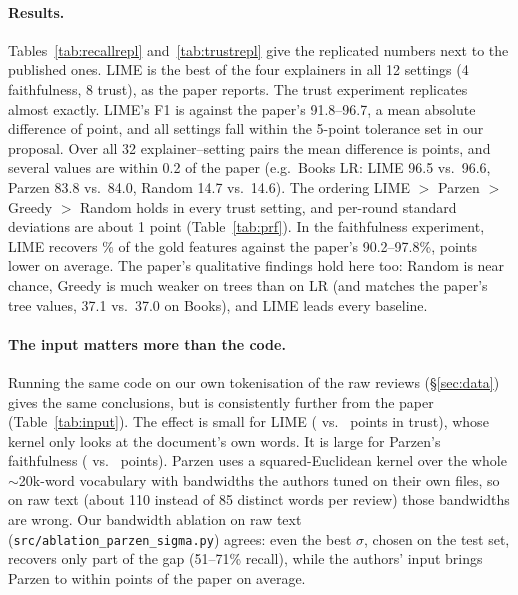 \paragraph{Results.} Tables~\ref{tab:recallrepl} and~\ref{tab:trustrepl} give the replicated numbers next to the published ones. LIME is the best of the four explainers in all 12 settings (4 faithfulness, 8 trust), as the paper reports. The trust experiment replicates almost exactly. LIME's F1 is \ReplTrustRange{} against the paper's 91.8--96.7, a mean absolute difference of \ReplTrustMAE{} point, and all \ReplTrustWithinFive{} settings fall within the 5-point tolerance set in our proposal. Over all 32 explainer--setting pairs the mean difference is \ReplTrustAllMAE{} points, and several values are within 0.2 of the paper (e.g.\ Books LR: LIME 96.5 vs.\ 96.6, Parzen 83.8 vs.\ 84.0, Random 14.7 vs.\ 14.6). The ordering LIME $>$ Parzen $>$ Greedy $>$ Random holds in every trust setting, and per-round standard deviations are about 1 point (Table~\ref{tab:prf}). In the faithfulness experiment, LIME recovers \ReplRecallRange{}\% of the gold features against the paper's 90.2--97.8\%, \ReplRecallGap{} points lower on average. The paper's qualitative findings hold here too: Random is near chance, Greedy is much weaker on trees than on LR (and matches the paper's tree values, 37.1 vs.\ 37.0 on Books), and LIME leads every baseline.

\paragraph{The input matters more than the code.} Running the same code on our own tokenisation of the raw reviews (\S\ref{sec:data}) gives the same conclusions, but is consistently further from the paper (Table~\ref{tab:input}). The effect is small for LIME (\MAERawTrustLime{} vs.\ \MAEAclTrustLime{} points in trust), whose kernel only looks at the document's own words. It is large for Parzen's faithfulness (\MAERawFaithParzen{} vs.\ \MAEAclFaithParzen{} points). Parzen uses a squared-Euclidean kernel over the whole $\sim$20k-word vocabulary with bandwidths the authors tuned on their own files, so on raw text (about 110 instead of 85 distinct words per review) those bandwidths are wrong. Our bandwidth ablation on raw text (\texttt{src/ablation\_parzen\_sigma.py}) agrees: even the best $\sigma$, chosen on the test set, recovers only part of the gap (51--71\% recall), while the authors' input brings Parzen to within \MAEAclFaithParzen{} points of the paper on average.

